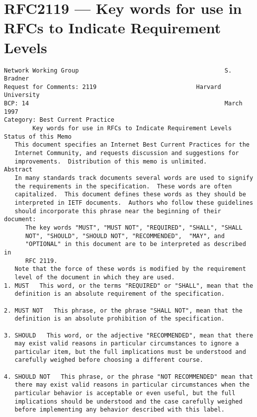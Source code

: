 \chapter{RFC2119 --- Key words for use in RFCs to Indicate Requirement Levels }

\clearpage

\begin{verbatim}
Network Working Group                                         S. Bradner
Request for Comments: 2119                            Harvard University
BCP: 14                                                       March 1997
Category: Best Current Practice
        Key words for use in RFCs to Indicate Requirement Levels
Status of this Memo
   This document specifies an Internet Best Current Practices for the
   Internet Community, and requests discussion and suggestions for
   improvements.  Distribution of this memo is unlimited.
Abstract
   In many standards track documents several words are used to signify
   the requirements in the specification.  These words are often
   capitalized.  This document defines these words as they should be
   interpreted in IETF documents.  Authors who follow these guidelines
   should incorporate this phrase near the beginning of their document:
      The key words "MUST", "MUST NOT", "REQUIRED", "SHALL", "SHALL
      NOT", "SHOULD", "SHOULD NOT", "RECOMMENDED",  "MAY", and
      "OPTIONAL" in this document are to be interpreted as described in
      RFC 2119.
   Note that the force of these words is modified by the requirement
   level of the document in which they are used.
1. MUST   This word, or the terms "REQUIRED" or "SHALL", mean that the
   definition is an absolute requirement of the specification.

2. MUST NOT   This phrase, or the phrase "SHALL NOT", mean that the
   definition is an absolute prohibition of the specification.

3. SHOULD   This word, or the adjective "RECOMMENDED", mean that there
   may exist valid reasons in particular circumstances to ignore a
   particular item, but the full implications must be understood and
   carefully weighed before choosing a different course.

4. SHOULD NOT   This phrase, or the phrase "NOT RECOMMENDED" mean that
   there may exist valid reasons in particular circumstances when the
   particular behavior is acceptable or even useful, but the full
   implications should be understood and the case carefully weighed
   before implementing any behavior described with this label.


\end{verbatim}
